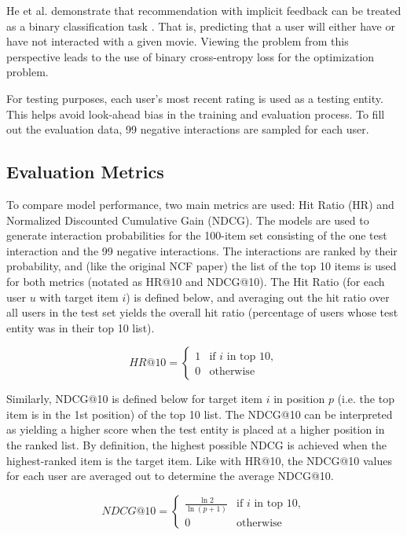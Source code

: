 \documentclass{article}
\begin{document}
He et al. demonstrate that recommendation with implicit feedback can be treated as a binary classification task \cite{he2017neural}. That is, predicting that a user will either have or have not interacted with a given movie. Viewing the problem from this perspective leads to the use of binary cross-entropy loss for the optimization problem.

For testing purposes, each user's most recent rating is used as a testing entity. This helps avoid look-ahead bias in the training and evaluation process. To fill out the evaluation data, 99 negative interactions are sampled for each user.

\subsection{Evaluation Metrics}
To compare model performance, two main metrics are used: Hit Ratio (HR) and Normalized Discounted Cumulative Gain (NDCG). The models are used to generate interaction probabilities for the 100-item set consisting of the one test interaction and the 99 negative interactions. The interactions are ranked by their probability, and (like the original NCF paper) the list of the top 10 items is used for both metrics (notated as HR@10 and NDCG@10). The Hit Ratio (for each user $u$ with target item $i$) is defined below, and averaging out the hit ratio over all users in the test set yields the overall hit ratio (percentage of users whose test entity was in their top 10 list).

\[
HR@10 = 
\begin{cases}
1 & \text{if $i$ in top 10}, \\
0 & \text{otherwise}
\end{cases}
\]

Similarly, NDCG@10 is defined below for target item $i$ in position $p$ (i.e. the top item is in the 1st position) of the top 10 list. The NDCG@10 can be interpreted as yielding a higher score when the test entity is placed at a higher position in the ranked list. By definition, the highest possible NDCG is achieved when the highest-ranked item is the target item. Like with HR@10, the NDCG@10 values for each user are averaged out to determine the average NDCG@10.

\[
NDCG@10 = 
\begin{cases}
\frac{\ln 2}{\ln(p + 1)}& \text{if $i$ in top 10}, \\
0 & \text{otherwise}
\end{cases}
\]
\end{document}
